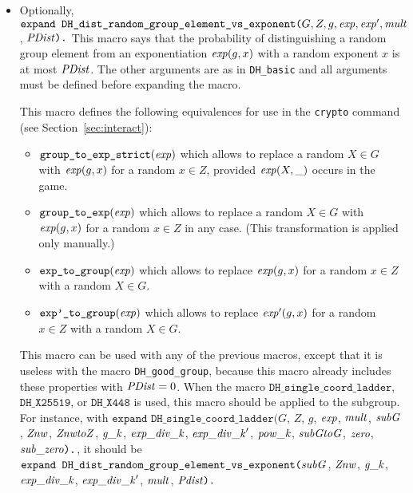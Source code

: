 \documentclass{article}
\begin{document}
\begin{itemize}
\begin{itemize}
\begin{itemize}
     \end{itemize}

   \item Optionally, 
     $\texttt{expand\ DH\_dist\_random\_group\_element\_vs\_exponent(}G,
     Z, g, \vn{exp}, \vn{exp}', \vn{mult}$, $\mathit{PDist}\texttt{).}$ This macro says
     that the probability of distinguishing a random group element
     from an exponentiation $\mathit{exp}(g,x)$ with a random exponent $x$
     is at most $\mathit{PDist}$.  The other arguments are as in
     \texttt{DH\_basic} and all arguments must be defined before 
     expanding the macro.

   This macro defines the following equivalences for use in the
   \texttt{crypto} command (see Section~\ref{sec:interact}):
   \begin{itemize}
   \item $\texttt{group\_to\_exp\_strict}(\mathit{exp})$ which allows to replace
     a random $X \in G$ with $\mathit{exp}(g,x)$ for a random $x \in Z$, provided
     $\mathit{exp}(X,\_)$ occurs in the game.
   \item $\texttt{group\_to\_exp}(\mathit{exp})$ which allows to replace
     a random $X \in G$ with $\mathit{exp}(g,x)$ for a random $x \in Z$ in any case.
     (This transformation is applied only manually.)
   \item $\texttt{exp\_to\_group}(\mathit{exp})$ which allows to replace
     $\mathit{exp}(g,x)$ for a random $x \in Z$ with a random $X \in G$.
   \item $\texttt{exp'\_to\_group}(\mathit{exp})$ which allows to replace
     $\mathit{exp'}(g,x)$ for a random $x \in Z$ with a random $X \in G$.
   \end{itemize}

     This macro can be used with any of the previous macros, except
     that it is useless with the macro \texttt{DH\_good\_group}, because this macro
     already includes these properties with $\mathit{PDist} = 0$. When the macro 
$\texttt{DH\_single\_coord\_ladder}$, $\texttt{DH\_X25519}$, or $\texttt{DH\_X448}$ is used, this macro should be applied to the subgroup. For instance, with
$\texttt{expand\ DH\_single\_coord\_ladder}(G$, $Z$, $g$, $\mathit{exp}$, $\mathit{mult}$, $\mathit{subG}$, $\mathit{Znw}$, $\mathit{ZnwtoZ}$, $\mathit{g\_k}$, $\mathit{exp\_div\_k}$, $\mathit{exp\_div\_k}'$, $\mathit{pow\_k}$, $\mathit{subGtoG}$, $\mathit{zero}$, $\mathit{sub\_zero}\texttt{).}$, it should be
     $\texttt{expand\ DH\_dist\_random\_group\_element\_vs\_exponent(}\vn{subG}$, $\mathit{Znw}$, $\mathit{g\_k}$, $\mathit{exp\_div\_k}$, $\mathit{exp\_div\_k}'$, $\mathit{mult}$, $\mathit{Pdist}\texttt{).}$
     

\end{itemize}
\end{itemize}
\end{document}
